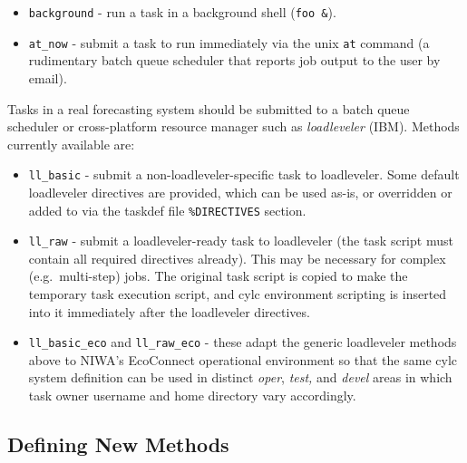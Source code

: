 \documentclass[11pt,a4paper]{article}
\begin{document}
\begin{itemize}

    \item \lstinline=background= - run a task in a background shell
        (\lstinline=foo &=). 

     \item \lstinline=at_now= - submit a task to run immediately via the
         unix \lstinline=at= command (a rudimentary batch queue
         scheduler that reports job output to the user by email).

\end{itemize}

Tasks in a real forecasting system should be submitted to a batch queue
scheduler or cross-platform resource manager such as {\em loadleveler}
(IBM). Methods currently available are:

\lstset{language=cylctaskdef}

\begin{itemize} 
    
    \item \lstinline=ll_basic= - submit a non-loadleveler-specific task
        to loadleveler. Some default loadleveler directives are
        provided, which can be used as-is, or overridden or added to
        via the taskdef file \lstinline=%DIRECTIVES= section.

    \item \lstinline=ll_raw= - submit a loadleveler-ready task to loadleveler (the task 
        script must contain all required directives already). This may be necessary for
        complex (e.g.\ multi-step) jobs. The original task script is copied to
        make the temporary task execution script, and cylc environment
        scripting is inserted into it immediately after the loadleveler directives.

    \item \lstinline=ll_basic_eco= and \lstinline=ll_raw_eco= - these
        adapt the generic loadleveler methods above to NIWA's EcoConnect
        operational environment so that the same cylc system definition
        can be used in distinct {\em oper}, {\em test,} and {\em devel}
        areas in which task owner username and home directory vary
        accordingly.

\end{itemize}


\subsection{Defining New Methods}
\end{document}
